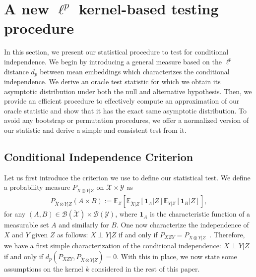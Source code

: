 \section{A new $\ell^p$ kernel-based testing procedure}
In this section, we present our statistical procedure to test for conditional independence. We begin by introducing a general measure based on the $\ell^p$ distance $d_p$ between mean embeddings which characterizes the conditional independence. We derive an oracle test statistic for which we obtain its asymptotic distribution under both the null and alternative hypothesis. Then, we provide an efficient procedure to effectively compute an approximation of our oracle statistic and show that it has the exact same asymptotic distribution. To avoid any bootstrap or permutation procedures, we offer a normalized version of our statistic and derive a simple and consistent test from it.


\subsection{Conditional Independence Criterion}
Let us first introduce the criterion we use to define our statistical test. We define a probability measure $P_{\ddot{X}\otimes Y|Z}$ on $\mathcal{\ddot{X}}\times\mathcal{Y}$ as
\begin{align*}
P_{\ddot{X}\otimes Y|Z}(A\times B):=\mathbb{E}_{Z}\left[\mathbb{E}_{\ddot{X}|Z}[\mathbf{1}_A|Z]\mathbb{E}_{Y|Z}[\mathbf{1}_B|Z]\right],
\end{align*}
for any $(A,B)\in\mathcal{B}(\mathcal{\ddot{X}})\times\mathcal{B}(\mathcal{Y})$, where $\mathbf{1}_A$ is the characteristic function of a measurable set $A$ and similarly for $B$. One now characterize the independence of $X$ and $Y$ given $Z$ as follows:  $X\perp Y | Z$ if and only if $P_{XZY}=P_{\ddot{X}\otimes Y|Z}$~\citep[Theorem 8]{fukumizu2004dimensionality}. Therefore, we have a first simple characterization of the conditional independence: $X\perp Y | Z$ if and only if $d_{p}(P_{XZY},P_{\ddot{X}\otimes Y|Z})=0$. With this in place, we now state some assumptions on the kernel $k$ considered in the rest of this paper.

